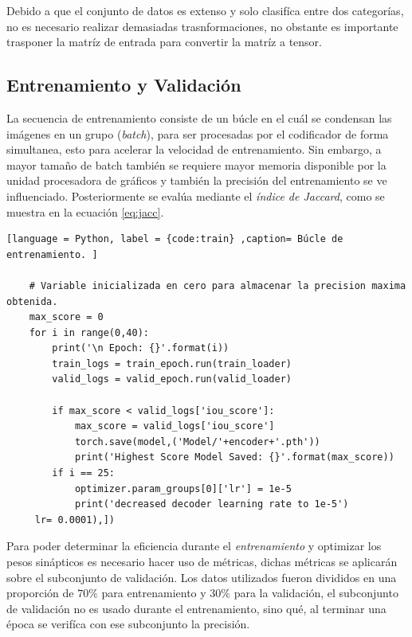 Debido a que el conjunto de datos es extenso y solo clasifíca entre dos categorías, no es necesario realizar demasiadas trasnformaciones, no obstante es importante trasponer la matríz de entrada para convertir la matríz a tensor.

\subsection{Entrenamiento y Validación}
La secuencia de entrenamiento consiste de un búcle en el cuál se condensan las imágenes en un grupo (\emph{batch}), para ser procesadas por el codificador de forma simultanea, esto para acelerar la velocidad de entrenamiento. Sin embargo, a mayor tamaño de batch también se requiere mayor memoria disponible por la unidad procesadora de gráficos y también la precisión del entrenamiento se ve influenciado. Posteriormente se evalúa mediante el \emph{índice de Jaccard}, como se muestra en la ecuación \ref{eq:jacc}.

\begin{lstlisting}[language = Python, label = {code:train} ,caption= Búcle de entrenamiento. ]

    # Variable inicializada en cero para almacenar la precision maxima obtenida.
    max_score = 0 
    for i in range(0,40):
        print('\n Epoch: {}'.format(i))
        train_logs = train_epoch.run(train_loader)
        valid_logs = valid_epoch.run(valid_loader)

        if max_score < valid_logs['iou_score']:
            max_score = valid_logs['iou_score']
            torch.save(model,('Model/'+encoder+'.pth'))
            print('Highest Score Model Saved: {}'.format(max_score))
        if i == 25:
            optimizer.param_groups[0]['lr'] = 1e-5
            print('decreased decoder learning rate to 1e-5')
     lr= 0.0001),])
\end{lstlisting}

Para poder determinar la eficiencia durante el \emph{entrenamiento} y optimizar los pesos sinápticos es necesario hacer uso de métricas, dichas métricas se aplicarán sobre el subconjunto de validación. Los datos utilizados fueron divididos en una proporción de $70\%$ para entrenamiento y $30\%$ para la validación, el subconjunto de validación no es usado durante el entrenamiento, sino qué, al terminar una época se verifíca con ese subconjunto la precisión.


